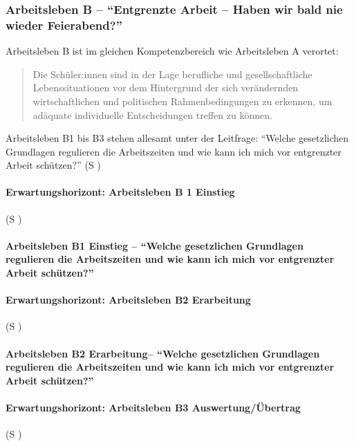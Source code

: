 \subsubsection{Arbeitsleben B -- \enquote{Entgrenzte Arbeit – Haben wir bald nie wieder Feierabend?}}
Arbeitsleben B ist im gleichen Kompetenzbereich wie Arbeitsleben A verortet: 
\begin{quotation}
    Die Schüler:innen sind in der Lage berufliche und gesellschaftliche Lebenssituationen vor dem Hintergrund der sich verändernden wirtschaftlichen und politischen Rahmenbedingungen zu erkennen, um adäquate individuelle Entscheidungen treffen zu können.

    \autocite[18]{bplan}
\end{quotation}

Arbeitsleben B1 bis B3 stehen allesamt unter der Leitfrage:
\enquote{Welche gesetzlichen Grundlagen regulieren die Arbeitszeiten und wie kann ich mich vor entgrenzter Arbeit schützen?} (\gls{S} \pageref{ARBEITSLEBEN-B1})


\paragraph{Erwartungshorizont: Arbeitsleben B 1 Einstieg} (\gls{S} \pageref{ARBEITSLEBEN-B1})

\paragraph{Arbeitsleben B1 Einstieg -- \enquote{Welche gesetzlichen Grundlagen regulieren die Arbeitszeiten und wie kann ich mich vor entgrenzter Arbeit schützen?}}



\paragraph{Erwartungshorizont: Arbeitsleben B2 Erarbeitung} (\gls{S} \pageref{ARBEITSLEBEN-B2})

\paragraph{Arbeitsleben B2 Erarbeitung-- \enquote{Welche gesetzlichen Grundlagen regulieren die Arbeitszeiten und wie kann ich mich vor entgrenzter Arbeit schützen?}}



\paragraph{Erwartungshorizont: Arbeitsleben B3 Auswertung/Übertrag} (\gls{S} \pageref{ARBEITSLEBEN-B3})

